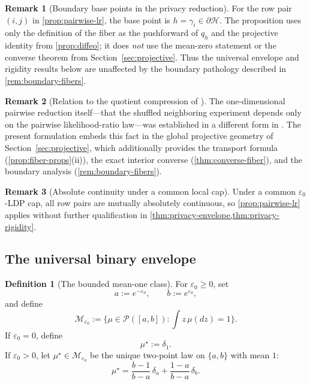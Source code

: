 \documentclass[11pt]{amsart}
\theoremstyle{definition}
\newtheorem{definition}[definition]{Definition}
\newtheorem{remark}[remark]{Remark}
\newcommand{\cP}{\mathcal P}
\newcommand{\cH}{\mathcal H}
\newcommand{\cM}{\mathcal M}
\begin{document}
\begin{remark}[Boundary base points in the privacy reduction]\label{rem:privacy-boundary}
For the row pair $(i,j)$ in \cref{prop:pairwise-lr}, the base point is $h=\gamma_i\in \partial\cH$. The proposition uses only the definition of the fiber as the pushforward of $q_h$ and the projective identity from \cref{prop:diffeo}; it does \emph{not} use the mean-zero statement or the converse theorem from Section~\ref{sec:projective}. Thus the universal envelope and rigidity results below are unaffected by the boundary pathology described in \cref{rem:boundary-fibers}.
\end{remark}

\begin{remark}[Relation to the quotient compression of {\cite{shvets-growing}}]\label{rem:growing-relation}
The one-dimensional pairwise reduction itself---that the shuffled neighboring experiment depends only on the pairwise likelihood-ratio law---was established in a different form in \cite[Theorem~3.2]{shvets-growing}. The present formulation embeds this fact in the global projective geometry of Section~\ref{sec:projective}, which additionally provides the transport formula (\cref{prop:fiber-props}(ii)), the exact interior converse (\cref{thm:converse-fiber}), and the boundary analysis (\cref{rem:boundary-fibers}).
\end{remark}

\begin{remark}[Absolute continuity under a common local cap]
Under a common $\varepsilon_0$-LDP cap, all row pairs are mutually absolutely continuous, so \cref{prop:pairwise-lr} applies without further qualification in \cref{thm:privacy-envelope,thm:privacy-rigidity}.
\end{remark}



\subsection{The universal binary envelope}


\begin{definition}[The bounded mean-one class]
For $\varepsilon_0\ge 0$, set
\[
a:=e^{-\varepsilon_0},\qquad b:=e^{\varepsilon_0},
\]
and define
\[
\cM_{\varepsilon_0}:=\bigl\{\mu\in\cP([a,b]): \int z\,\mu(dz)=1\bigr\}.
\]
If $\varepsilon_0=0$, define
\[
\mu^\star:=\delta_1.
\]
If $\varepsilon_0>0$, let $\mu^\star\in\cM_{\varepsilon_0}$ be the unique two-point law on $\{a,b\}$ with mean $1$:
\[
\mu^\star=\frac{b-1}{b-a}\,\delta_a+\frac{1-a}{b-a}\,\delta_b.
\]
\end{definition}
\end{document}
